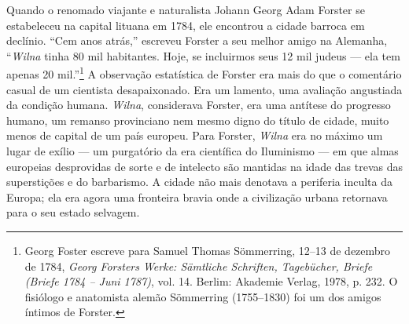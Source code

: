 Quando o renomado viajante e naturalista Johann Georg Adam Forster se
estabeleceu na capital lituana em 1784, ele encontrou a cidade barroca
em declínio. ``Cem anos atrás,'' escreveu Forster a seu melhor amigo na
Alemanha, ``\textit{Wilna} tinha 80 mil habitantes. Hoje, se incluirmos seus 12
mil judeus --- ela tem apenas 20 mil.''\footnote{Georg Foster escreve para Samuel Thomas Sömmerring, 12--13 de dezembro de 1784, \textit{Georg Forsters Werke: Sämtliche Schriften, Tagebücher, Briefe (Briefe 1784 -- Juni 1787)}, vol. 14. Berlim: Akademie Verlag, 1978, p. 232. O fisiólogo e anatomista alemão Sömmerring (1755--1830) foi um dos amigos íntimos de Forster.} A observação estatística de Forster era mais do que o comentário casual de um cientista
desapaixonado. Era um lamento, uma avaliação angustiada da condição
humana. \textit{Wilna}, considerava Forster, era uma antítese do progresso
humano, um remanso provinciano nem mesmo digno do título de cidade,
muito menos de capital de um país europeu. Para Forster, \textit{Wilna} era no
máximo um lugar de exílio --- um purgatório da era científica do
Iluminismo --- em que almas europeias desprovidas de sorte e de intelecto
são mantidas na idade das trevas das superstições e do barbarismo. A
cidade não mais denotava a periferia inculta da Europa; ela era agora
uma fronteira bravia onde a civilização urbana retornava para o seu
estado selvagem.

